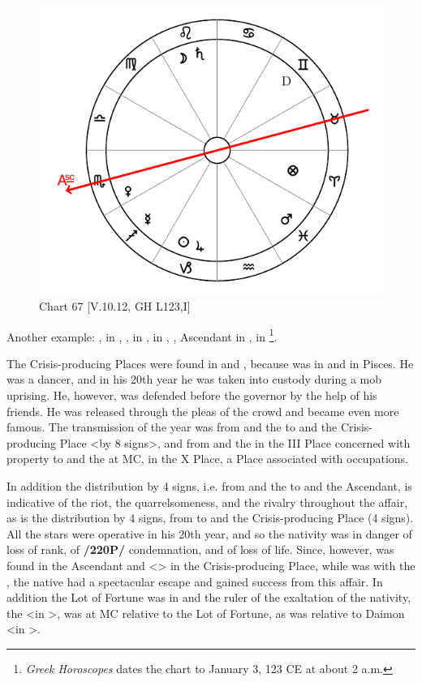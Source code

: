 \begin{figure}
\centering
\vspace{0pt}
\includegraphics[width=.68\textwidth]{charts/5_10_12}
\caption{Chart 67 [V.10.12, GH L123,I]}
\label{fig:chart67}
\end{figure}

Another example: \Sun, \Jupiter\xspace in \Capricorn, \Moon, \Saturn\xspace in \Leo, \Mars\xspace in \Pisces, \Venus, Ascendant in \Scorpio, \Mercury\xspace in \Sagittarius\footnote{\textit{Greek Horoscopes} dates the chart to January 3, 123 CE at about 2 a.m.}. 

The Crisis-producing Places were found in \Pisces\xspace and \Scorpio, because \Venus\xspace was in \Scorpio\xspace and \Mars in Pisces. He was a dancer, and in his 20th year he was taken into custody during a mob uprising. He, however, was defended before the governor by the help of his friends. He was released through the pleas of the crowd and became even more famous. The transmission of the year was from \Saturn\xspace and the \Moon\xspace to \Mars\xspace and the Crisis-producing Place <by 8 signs>, and from \Jupiter\xspace and the \Sun\xspace in the III Place concerned with property to \Saturn\xspace and the \Moon\xspace at MC, in the X Place, a Place associated with occupations. 

In addition the distribution by 4 signs, i.e. from \Saturn\xspace and the \Moon\xspace to \Venus\xspace and the Ascendant, is indicative of the riot, the quarrelsomeness, and the rivalry throughout the affair, as is the distribution by 4 signs, from \Mercury\xspace to \Mars\xspace and the Crisis-producing Place (4 signs). All the stars were operative in his 20th year, and so the nativity was in danger of loss of rank, of \textbf{/220P/} condemnation, and of loss of life. Since, however, \Venus\xspace was found in the Ascendant and <\Mars> in the Crisis-producing Place, while \Jupiter\xspace was with the \Sun, the native had a spectacular escape and gained
success from this affair. In addition the Lot of Fortune was in \Aries\xspace and the ruler of the exaltation of the nativity, the \Sun <in \Capricorn>, was at MC relative to the Lot of Fortune, as was \Mars\xspace relative to Daimon <in \Gemini>. 

